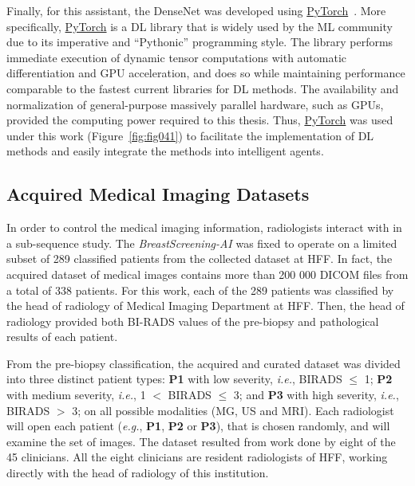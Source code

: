 Finally, for this assistant, the DenseNet was developed using \href{https://pytorch.org/}{PyTorch}~\cite{NEURIPS2019_bdbca288}.
More specifically, \href{https://pytorch.org/}{PyTorch} is a \ac{DL} library that is widely used by the \ac{ML} community due to its imperative and ``Pythonic'' programming style.
The library performs immediate execution of dynamic tensor computations with automatic differentiation and \ac{GPU} acceleration, and does so while maintaining performance comparable to the fastest current libraries for \ac{DL} methods.
The availability and normalization of general-purpose massively parallel hardware, such as \acp{GPU}, provided the computing power required to this thesis.
Thus, \href{https://pytorch.org/}{PyTorch} was used under this work  (Figure~\ref{fig:fig041}) to facilitate the implementation of \ac{DL} methods and easily integrate the methods into intelligent agents.

\subsection{Acquired Medical Imaging Datasets}
\label{sec:app002003004}

In order to control the medical imaging information, radiologists interact with in a sub-sequence study.
The {\it BreastScreening-AI} was fixed to operate on a limited subset of 289 classified patients from the collected dataset at \acf{HFF}.
In fact, the acquired dataset of medical images contains more than 200 000 \ac{DICOM} files from a total of 338 patients.
For this work, each of the 289 patients was classified by the head of radiology of Medical Imaging Department at \ac{HFF}.
Then, the head of radiology provided both \ac{BI-RADS} values of the pre-biopsy and pathological results of each patient.

From the pre-biopsy classification, the acquired and curated dataset was divided into three distinct patient types:
{\bf P1} with low severity, {\it i.e.}, BIRADS $\leq$ 1;
{\bf P2} with medium severity, {\it i.e.}, 1 $<$ BIRADS $\leq$ 3; and
{\bf P3} with high severity, {\it i.e.}, BIRADS $>$ 3;
on all possible modalities (\ac{MG}, \ac{US} and \ac{MRI}).
Each radiologist will open each patient ({\it e.g.}, {\bf P1}, {\bf P2} or {\bf P3}), that is chosen randomly, and will examine the set of images.
The dataset resulted from work done by eight of the 45 clinicians.
All the eight clinicians are resident radiologists of \acl{HFF}, working directly with the head of radiology of this institution.

